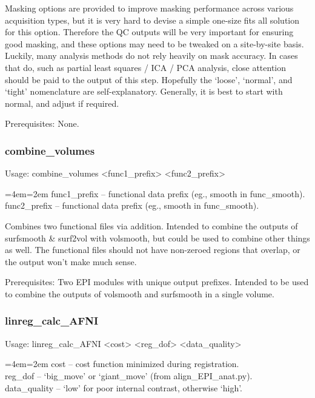 \documentclass[final,titlepage,letterpaper,oneside,12pt]{article}
\renewcommand{\texttt}[2][BrickRed]{\textcolor{#1}{\ttfamily #2}}%
\newenvironment{blockquote}{%
  \par%
  \medskip
  \leftskip=4em\rightskip=2em%
  \noindent\ignorespaces}{%
  \par\medskip}
\begin{document}
Masking options are provided to improve masking performance across various acquisition types, but it is very hard to devise a simple one-size fits all solution for this option. Therefore the QC outputs will be very important for ensuring good masking, and these options may need to be tweaked on a site-by-site basis. Luckily, many analysis methods do not rely heavily on mask accuracy. In cases that do, such as partial least squares / ICA / PCA analysis, close attention should be paid to the output of this step. Hopefully the `loose', `normal', and `tight' nomenclature are self-explanatory. Generally, it is best to start with normal, and adjust if required.

Prerequisites: None.

\subsubsection{combine\_volumes}
Usage: \texttt{combine\_volumes <func1\_prefix> <func2\_prefix>}

\begin{blockquote}
func1\_prefix -- functional data prefix (eg., smooth in func\_smooth).
func2\_prefix -- functional data prefix (eg., smooth in func\_smooth).
\end{blockquote}

\noindent Combines two functional files via addition. Intended to combine the outputs of \texttt{surfsmooth} \& \texttt{surf2vol} with \texttt{volsmooth}, but could be used to combine other things as well. The functional files should not have non-zeroed regions that overlap, or the output won't make much sense.

Prerequisites: Two EPI modules with unique output prefixes. Intended to be used to combine the outputs of \texttt{volsmooth} and \texttt{surfsmooth} in a single volume. 

\subsubsection{linreg\_calc\_AFNI}
Usage: \texttt{linreg\_calc\_AFNI <cost> <reg\_dof> <data\_quality>}

\begin{blockquote}
cost -- cost function minimized during registration. \\
reg\_dof -- `big\_move' or `giant\_move' (from align\_EPI\_anat.py). \\
data\_quality -- `low' for poor internal contrast, otherwise `high'. \
\end{blockquote}
\end{document}
